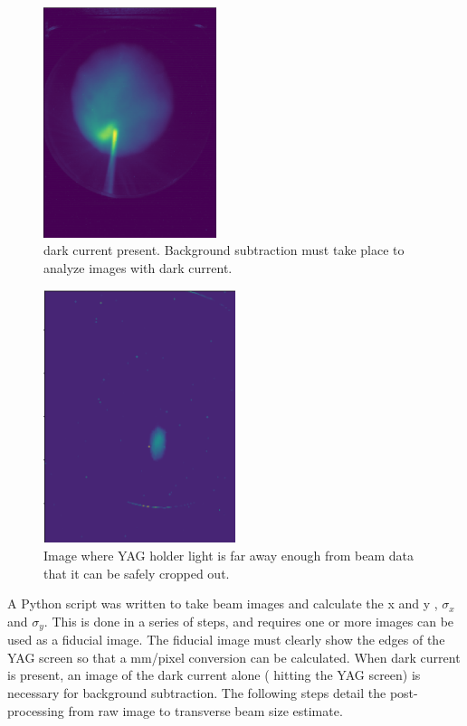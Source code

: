 \begin{figure}
	\centering
	\includegraphics[width=0.45\textwidth]{images/darkcurrent}
	\caption{ dark current  present. Background subtraction must take place to 
	analyze images with dark current.}
	\label{fig:darkcurrent}
\end{figure}	
\begin{figure}
	\centering
	\includegraphics[width=0.5\textwidth]{images/cleanyag}
	\caption{Image where YAG holder light is far away enough from beam data that it can be safely cropped out.}
	\label{fig:clean}
\end{figure}

A Python script was written to take beam images and calculate the  x and y , $\sigma_{x}$ and $\sigma_y$.  
This is done in a series of steps, and requires  one or more images  can be used as a 
fiducial image. The fiducial image must clearly show the edges of the YAG screen so that a 
mm/pixel conversion can be calculated.
When dark current is present, an image of the dark current alone
( hitting the YAG screen) is necessary for background subtraction.
The following steps detail the post-processing from raw image to transverse beam size estimate.

